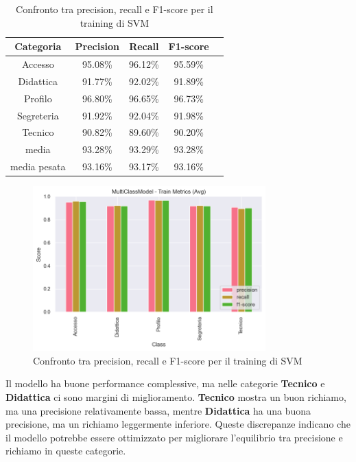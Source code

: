 \begin{table}[H]
    \centering
    \begin{tabular}{|c|c|c|c|c|}
        \hline
        \textbf{Categoria} & \textbf{Precision} & \textbf{Recall} & \textbf{F1-score} \\
        \hline
        Accesso & 95.08\% & 96.12\% & 95.59\% \\
        \hline
        Didattica & 91.77\% & 92.02\% & 91.89\% \\
        \hline
        Profilo & 96.80\% & 96.65\% & 96.73\% \\
        \hline
        Segreteria & 91.92\% & 92.04\% & 91.98\% \\
        \hline
        Tecnico & 90.82\% & 89.60\% & 90.20\% \\
        \hline
        media & 93.28\% & 93.29\% & 93.28\% \\
        \hline
        media pesata & 93.16\% & 93.17\% & 93.16\% \\
        \hline
    \end{tabular}
    \caption{Confronto tra precision, recall e F1-score per il training di SVM}
    \label{tab:metriche_svm_train}
\end{table}

\begin{figure}[H]
    \centering
    \includegraphics[width=0.8\textwidth]{images/metrics_train_svm.png}
    \caption{Confronto tra precision, recall e F1-score per il training di SVM}
    \label{fig:metrics_train_svm}
\end{figure}

Il modello ha buone performance complessive, ma nelle categorie \textbf{Tecnico} e \textbf{Didattica} ci sono margini di miglioramento. \textbf{Tecnico} mostra un buon richiamo, ma una precisione relativamente bassa, mentre \textbf{Didattica} ha una buona precisione, ma un richiamo leggermente inferiore. Queste discrepanze indicano che il modello potrebbe essere ottimizzato per migliorare l'equilibrio tra precisione e richiamo in queste categorie.

